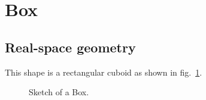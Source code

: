 





\section{Box}  

\subsection{Real-space geometry}
This shape is a rectangular cuboid as
shown in fig.~\ref{fig:box}. 


\begin{figure}[ht]
\hfill
{}
\hfill
{}
\hfill
\caption{Sketch of a Box.}
\label{fig:box}
\end{figure}

